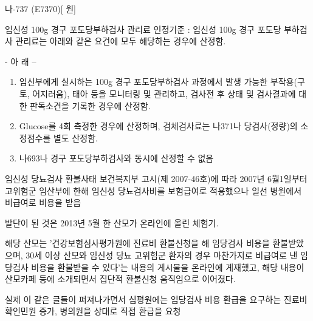 \prezi{\clearpage}
{
나-737 (E7370)[ 원]
}
{
임신성 100g 경구 포도당부하검사 관리료 인정기준 : 임신성 100g 경구 포도당 부하검사 관리료는 아래와 같은 요건에 모두 해당하는 경우에 산정함. \par
     - 아 래 – 
\begin{enumerate}[가.]\tightlist
\item 임신부에게 실시하는 100g 경구 포도당부하검사 과정에서 발생 가능한 부작용(구토, 어지러움), 태아 등을 모니터링 및 관리하고, 검사전\cntrdot{} 후 상태 및 검사결과에 대한 판독소견을 기록한 경우에 산정함. 
\item Glucose를 4회 측정한 경우에 산정하며, 검체검사료는 나371나 당검사(정량)의 소 정점수를 별도 산정함. 
\item 나693나 경구 포도당부하검사와 동시에 산정할 수 없음
\end{enumerate} 
}
\prezi{\clearpage}
\par
\medskip
\begin{commentbox}{임신성 당뇨검사 환불사태}
보건복지부 고시(제 2007-46호)에 따라 2007년 6월1일부터 고위험군 임산부에 한해 임신성 당뇨검사비를 보험급여로 적용했으나 일선 병원에서 비급여로 비용을 받음\par
발단이 된 것은 2013년 5월 한 산모가 온라인에 올린 체험기.\par
해당 산모는 '건강보험심사평가원에 진료비 환불신청을 해 임당검사 비용을 환불받았으며, 30세 이상 산모와 임신성 당뇨 고위험군 환자의 경우 마찬가지로 비급여로 낸 임당검사 비용을 환불받을 수 있다'는 내용의 게시물을 온라인에 게재했고, 해당 내용이 산모카페 등에 소개되면서 집단적 환불신청 움직임으로 이어졌다.\par
실제 이 같은 글들이 퍼져나가면서 심평원에는 임당검사 비용 환급을 요구하는 진료비 확인민원 증가, 병의원을 상대로 직접 환급을 요청
\end{commentbox}